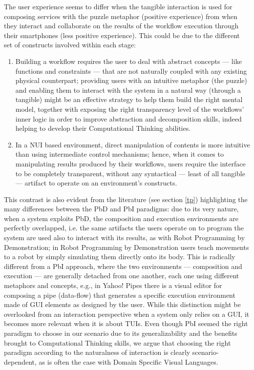 The user experience seems to differ when the tangible interaction is used for composing services with the puzzle metaphor (positive experience) from when they interact and collaborate on the results of the workflow execution through their smartphones (less positive experience). This could be due to the different set of constructs involved within each stage:

\begin{enumerate}
\item Building a workflow requires the user to deal with abstract concepts --- like functions and constraints --- that are not naturally coupled with any existing physical counterpart; providing users with an intuitive metaphor (the puzzle) and enabling them to interact with the system in a natural way (through a tangible) might be an effective strategy to help them build the right mental model, together with exposing the right transparency level of the workflows' inner logic in order to improve abstraction and decomposition skills, indeed helping to develop their Computational Thinking abilities. 

\item In a \ac{NUI} based environment, direct manipulation of contents is more intuitive than using intermediate control mechanisms; hence, when it comes to manipulating results produced by their workflows, users require the interface to be completely transparent, without any syntactical --- least of all tangible --- artifact to operate on an environment's constructs. 
\end{enumerate}

This contrast is also evident from the literature (see section \ref{tp}) highlighting the many differences between the \ac{PbD} and \ac{PbI} paradigms: due to its very nature, when a system exploits \ac{PbD}, the composition and execution environments are perfectly overlapped, i.e. the same artifacts the users operate on to program the system are used also to interact with its results, as with Robot Programming by Demonstration; in Robot Programming by Demonstration users teach movements to a robot by simply simulating them directly onto its body. This is radically different from a \ac{PbI} approach, where the two environments --- composition and execution --- are generally detached from one another, each one using different metaphors and concepts, e.g., in Yahoo! Pipes there is a visual editor for composing a pipe (data-flow) that generates a specific execution environment made of \ac{GUI} elements as designed by the user. While this distinction might be overlooked from an interaction perspective when a system only relies on a \ac{GUI}, it becomes more relevant when it is about \acp{TUI}. Even though \ac{PbI} seemed the right paradigm to choose in our scenario due to its generalizability and the benefits brought to Computational Thinking skills, we argue that choosing the right paradigm according to the naturalness of interaction is clearly scenario-dependent, as is often the case with Domain Specific Visual Languages.

